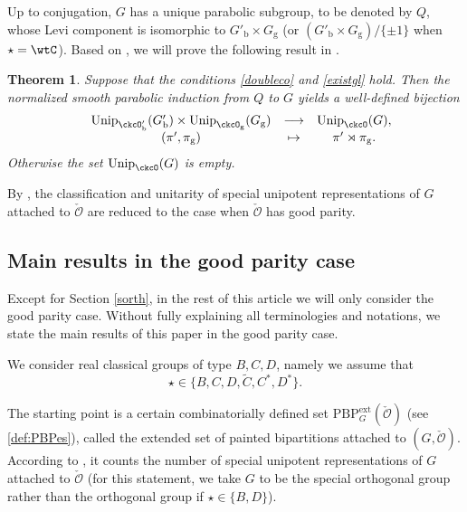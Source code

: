 \documentclass[11pt,a4paper]{amsart}
\newcommand{\CO}{{\mathcal {O}}}
\numberwithin{equation}{section}
\newtheorem{thm}{Theorem}[section]
\theoremstyle{remark}
\def\Unip{\mathrm{Unip}}
\def\PBPeg{\mathrm{PBP}^{\mathrm{ext}}_{G}}
\begin{document}
Up to conjugation, $G$ has a unique parabolic subgroup, to be denoted by $Q$, whose Levi component is 
isomorphic to   $G'_\mathrm b\times G_\mathrm g$ (or   $(G'_\mathrm b\times G_\mathrm g)/\{\pm 1\} $ when $\star=\wtC$). Based on \cite[Theorems 2.17 and 2.21]{BMSZa}, we will prove the following result in .   
\begin{thm} %
\label{thmB}
 Suppose that the conditions  \eqref{doubleco} and \eqref{existgl} hold. Then the normalized smooth parabolic induction from $Q$ to $G$ yields
   a well-defined bijection
   \[
    \begin{array}{rccc}
 &\Unip_{\ckcO'_{\mathrm b}}( G'_{\mathrm b}) \times   \Unip_{\ckcO_{\mathrm g}}( G_{\mathrm g})  &         \longrightarrow &\Unip_{\ckcO }(G), \\
                &   (\pi',\pi_\mathrm g) & \mapsto & \pi'\rtimes \pi_\mathrm g.
    \end{array}
 \]
 Otherwise the set $\Unip_{\ckcO }(G)$ is empty. 
\end{thm}


By , the classification and unitarity  of special unipotent representations of $G$ attached to $\check \CO$ are reduced to the case when $\check \CO$ has good parity. 

\subsection{Main results in the good parity case}\label{subsec:goodPR}


Except for Section \ref{sorth}, in the rest of this article we will only consider the good parity case. Without fully explaining all terminologies and notations, we state the main results of this paper in the good parity case.   

We consider real classical groups of type $B,C,D$, namely we  assume that \[\star\in \{B,C,D,\widetilde {C}, C^*, D^*\}.\] 

The starting point is a certain combinatorially defined set $\PBPeg(\check \CO)$ (see \eqref{def:PBPes}), called the extended set of painted bipartitions attached to $(G, \check \CO)$. According to \cite{BMSZa}, it counts the number of special unipotent representations of $G$ attached to $\check \CO$ (for this statement, we take $G$ to be the special orthogonal group rather than the orthogonal group if $\star\in \{B,D\}$). 
\end{document}
